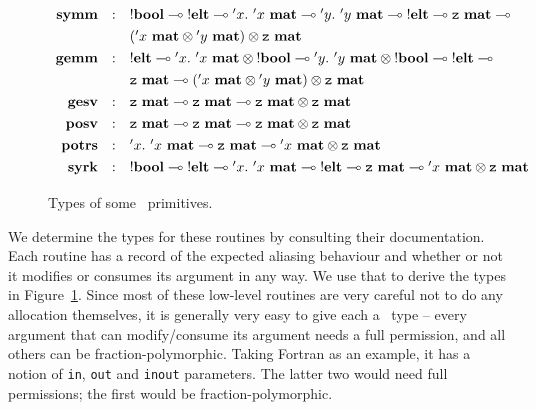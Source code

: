 \begin{figure}
    \begin{center}
    \[\def\arraystretch{1.3}
    \begin{array}{rcl}
%
        \ottkw{symm} &:& {!\Bool} \multimap {!\Elt} \multimap {'x}.\
            {{'x}\ \Mat} \multimap {'y}.\ {{'y}\ \Mat} \multimap {!\Elt}
            \multimap {\Zf\ \Mat} \multimap
            \\ && ( {{'x}\ \Mat} \otimes {{'y}\ \Mat} ) \otimes {\Zf\ \Mat} \\
%
        \ottkw{gemm} &:& {!\Elt} \multimap {'x}.\ {{'x}\ \Mat} \otimes
            {!\Bool} \multimap {'y}.\ {{'y}\ \Mat} \otimes {!\Bool}
            \multimap {!\Elt} \multimap
            \\ && {\Zf\ \Mat} \multimap ( {{'x}\ \Mat} \otimes {{'y}\ \Mat} )
            \otimes {\Zf\ \Mat} \\
%
        \ottkw{gesv} &:& {\Zf\ \Mat} \multimap {\Zf\ \Mat} \multimap
            {\Zf\ \Mat} \otimes {\Zf\ \Mat} \\
%
        \ottkw{posv} &:& {\Zf\ \Mat} \multimap {\Zf\ \Mat} \multimap
            {\Zf\ \Mat} \otimes {\Zf\ \Mat} \\
%
        \ottkw{potrs} &:& {'x}.\ {{'x}\ \Mat} \multimap {\Zf\ \Mat}
            \multimap {{'x}\ \Mat} \otimes {\Zf\ \Mat} \\
%
        \ottkw{syrk} &:& {!\Bool} \multimap {!\Elt} \multimap {'x}.\
            {{'x}\ \Mat} \multimap {!\Elt} \multimap {\Zf\ \Mat} \multimap
            {{'x}\ \Mat} \otimes {\Zf\ \Mat} \\
%
    \end{array} \]
    \end{center}
    \caption{Types of some \lang\ primitives.}\label{fig:primitive_types}
\end{figure}

We determine the types for these routines by consulting their documentation.
Each routine has a record of the expected aliasing behaviour and whether or not
it modifies or consumes its argument in any way. We use that to derive the
types in Figure~\ref{fig:primitive_types}. Since most of these low-level
routines are very careful not to do any allocation themselves, it is generally
very easy to give each a \lang\ type -- every argument that can modify/consume
its argument needs a full permission, and all others can be
fraction-polymorphic.  Taking Fortran as an example, it has a notion of
\texttt{in}, \texttt{out} and \texttt{inout} parameters. The latter two would
need full \Zf permissions; the first would be fraction-polymorphic.

